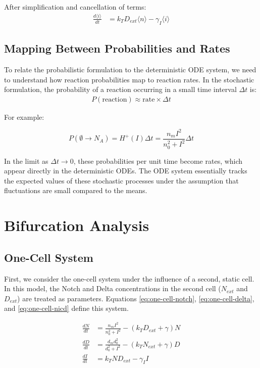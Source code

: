 \documentclass{article}
\begin{document}
\begin{flushleft}
After simplification and cancellation of terms:
\begin{align*}
\frac{d\langle i \rangle}{dt} &= k_T D_{ext} \langle n \rangle - \gamma_I \langle i \rangle
\end{align*}

\subsection*{Mapping Between Probabilities and Rates}

To relate the probabilistic formulation to the deterministic ODE system, we need to understand how reaction probabilities map to reaction rates. In the stochastic formulation, the probability of a reaction occurring in a small time interval $\Delta t$ is:
\begin{align*}
P(\text{reaction}) \approx \text{rate} \times \Delta t
\end{align*}

For example:

\[
P(\emptyset \rightarrow N_A) = H^+(I) \Delta t = \frac{n_m I^2}{n_0^2 + I^2} \Delta t 
\]

In the limit as $\Delta t \rightarrow 0$, these probabilities per unit time become rates, which appear directly in the deterministic ODEs. The ODE system essentially tracks the expected values of these stochastic processes under the assumption that fluctuations are small compared to the means.

\section{Bifurcation Analysis}
\label{sec:bifurcation}

\subsection*{One-Cell System}

First, we consider the one-cell system under the influence of a second, static cell. In this model, the Notch and Delta concentrations in the second cell ($N_{ext}$ and $D_{ext}$) are treated as parameters. Equations \ref{eq:one-cell-notch}, \ref{eq:one-cell-delta}, and \ref{eq:one-cell-nicd} define this system.

\begin{align}
  \label{eq:one-cell-notch}
  \frac{dN}{dt} &= \frac{n_{m}I^2}{n_{0}^2 + I^2} - (k_{T}D_{ext} + \gamma)N \\[5pt]
  \label{eq:one-cell-delta}
  \frac{dD}{dt} &= \frac{d_{m}d_{0}^2}{d_{0}^2 + I^2} - (k_{T}N_{ext} + \gamma)D \\[5pt]
  \label{eq:one-cell-nicd}
  \frac{dI}{dt} &= k_{T}ND_{ext} - \gamma_{I}I
\end{align}


\end{flushleft}
\end{document}
